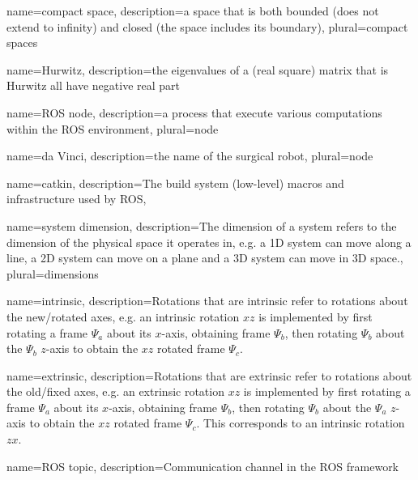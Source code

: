 {name={compact space},
 description={a space that is both bounded (does not extend to infinity) and closed (the space includes its boundary)},
 plural={compact spaces}
}

{name={Hurwitz},
 description={the eigenvalues of a (real square) matrix that is Hurwitz all have negative real part}
}

{name=ROS node,
 description={a process that execute various computations within the ROS environment},
 plural={node}
}


{name=da Vinci,
 description={the name of the surgical robot},
 plural={node}
}

{name=catkin,
 description={The build system (low-level) macros and infrastructure used by ROS},
}


{name={system dimension},
 description={The dimension of a system refers to the dimension of the physical space it operates in, e.g. a 1D system can move along a line, a 2D system can move on a plane and a 3D system can move in 3D space.},
 plural={dimensions}
}


{name={intrinsic},
	description={Rotations that are intrinsic refer to rotations about the new/rotated axes, e.g. an intrinsic rotation $xz$ is implemented by first rotating a frame $\Psi_a$ about its $x$-axis, obtaining frame $\Psi_b$, then rotating $\Psi_b$ about the $\Psi_b$ $z$-axis to obtain the $xz$ rotated frame $\Psi_c$.}
}

{name={extrinsic},
	description={Rotations that are extrinsic refer to rotations about the old/fixed axes, e.g. an extrinsic rotation $xz$ is implemented by first rotating a frame $\Psi_a$ about its $x$-axis, obtaining frame $\Psi_b$, then rotating $\Psi_b$ about the $\Psi_a$ $z$-axis to obtain the $xz$ rotated frame $\Psi_c$. This corresponds to an intrinsic rotation $zx$.}
}

{name={ROS topic},
	description={Communication channel in the ROS framework}
}


